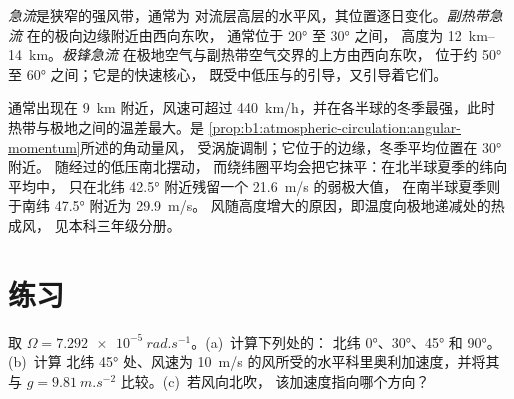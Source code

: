 \begin{definition}[急流；副热带急流与极锋急流]\label{def:b1:atmospheric-circulation:jet}
\emph{急流}是狭窄的强风带，通常为
对流层高层的水平风，其位置逐日变化。\emph{副热带急流}
在的极向边缘附近由西向东吹，
通常位于 \ang{20} 至 \ang{30} 之间，
高度为 \qtyrange{12}{14}{km}。\emph{极锋急流}
在极地空气与副热带空气交界的上方由西向东吹，
位于约 \ang{50} 至 \ang{60} 之间；它是的快速核心，
既受中低压与的引导，又引导着它们。
\end{definition}

通常出现在 \qty{9}{km} 附近，风速可超过
\qty{440}{km/h}，并在各半球的冬季最强，此时
热带与极地之间的温差最大。是
\cref{prop:b1:atmospheric-circulation:angular-momentum}所述的角动量风，
受涡旋调制；它位于的边缘，冬季平均位置在 \ang{30} 附近。
随经过的低压南北摆动，
而绕纬圈平均会把它抹平：在北半球夏季的纬向平均中，
只在北纬 \ang{42.5} 附近残留一个 \qty{21.6}{m/s} 的弱极大值，
在南半球夏季则于南纬 \ang{47.5} 附近为 \qty{29.9}{m/s}。
风随高度增大的原因，即温度向极地递减处的热成风，
见本科三年级分册。

\section{练习}

\begin{exercise}[$\star$]\label{exo:b1:atmospheric-circulation:1}
取 $\Omega = \qty{7.292e-5}{rad.s^{-1}}$。(a)~计算下列处的：
北纬 \ang{0}、\ang{30}、\ang{45} 和 \ang{90}。(b)~计算
北纬 \ang{45} 处、风速为 \qty{10}{m/s} 的风所受的水平科里奥利加速度，并将其与 $g =
\qty{9.81}{m.s^{-2}}$ 比较。(c)~若风向北吹，
该加速度指向哪个方向？
\end{exercise}

